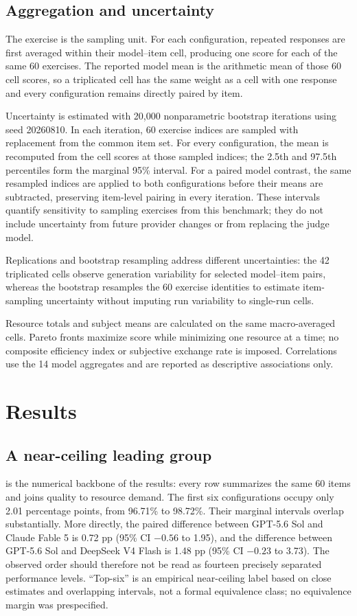 \documentclass[11pt,a4paper,twocolumn]{article}
\begin{document}
\subsection{Aggregation and uncertainty}

The exercise is the sampling unit. For each configuration, repeated responses
are first averaged within their model--item cell, producing one score for each
of the same 60 exercises. The reported model mean is the arithmetic mean of
those 60 cell scores, so a triplicated cell has the same weight as a cell with
one response and every configuration remains directly paired by item.

Uncertainty is estimated with 20,000 nonparametric bootstrap iterations using
seed 20260810. In each iteration, 60 exercise indices are sampled with
replacement from the common item set. For every configuration, the mean is
recomputed from the cell scores at those sampled indices; the 2.5th and 97.5th
percentiles form the marginal 95\% interval. For a paired model contrast, the
same resampled indices are applied to both configurations before their means
are subtracted, preserving item-level pairing in every iteration. These
intervals quantify sensitivity to sampling exercises from this benchmark; they
do not include uncertainty from future provider changes or from replacing the
judge model.

Replications and bootstrap resampling address different uncertainties: the 42
triplicated cells observe generation variability for selected model--item
pairs, whereas the bootstrap resamples the 60 exercise identities to estimate
item-sampling uncertainty without imputing run variability to single-run cells.

Resource totals and subject means are calculated on the same macro-averaged
cells. Pareto fronts maximize score while minimizing one resource at a time;
no composite efficiency index or subjective exchange rate is imposed.
Correlations use the 14 model aggregates and are reported as descriptive
associations only.

\section{Results}\label{sec:results}

\subsection{A near-ceiling leading group}

 is the numerical backbone of the results: every row
summarizes the same 60 items and joins quality to resource demand. The first six
configurations occupy only 2.01 percentage points, from 96.71\% to 98.72\%.
Their marginal intervals overlap substantially. More directly, the paired
difference between GPT-5.6 Sol and Claude Fable 5 is 0.72 pp (95\% CI
$-0.56$ to 1.95), and the difference between GPT-5.6 Sol and DeepSeek V4 Flash
is 1.48 pp (95\% CI $-0.23$ to 3.73). The observed order should therefore not
be read as fourteen precisely separated performance levels. ``Top-six'' is an
empirical near-ceiling label based on close estimates and overlapping intervals,
not a formal equivalence class; no equivalence margin was prespecified.
\end{document}
